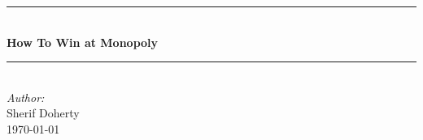 \documentclass[12pt]{article}
\begin{document}
\begin{titlepage}

\newcommand{\HRule}{\rule{\linewidth}{0.5mm}} %
\setlength{\topmargin}{0in}
\center %
 


\HRule \\[0.4cm]
{ \huge \bfseries How To Win at Monopoly}\\[0.4cm] %
\HRule \\[1cm]
 

\emph{Author:}\\
Sherif Doherty \\ %


{\large \today}\\[0.5cm] %


\vfill %

\end{titlepage}

\newpage
\tableofcontents
\newpage

\newpage

\newpage

\end{document}
